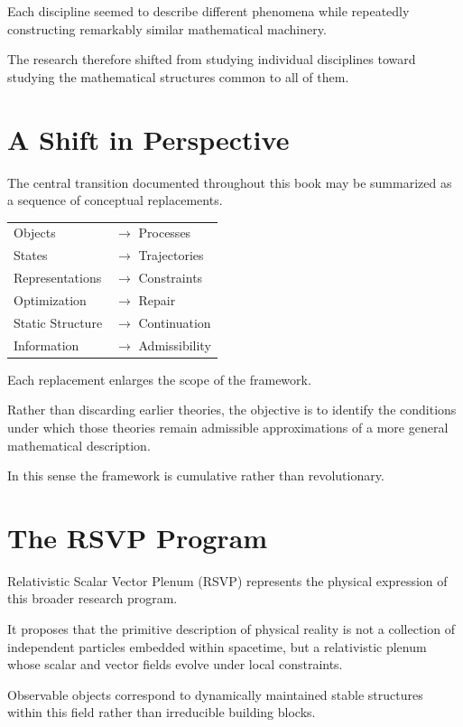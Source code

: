\documentclass[11pt,oneside]{book}
\numberwithin{equation}{chapter}
\theoremstyle{definition}
\theoremstyle{plain}
\begin{document}
Each discipline seemed to describe different phenomena while repeatedly
constructing remarkably similar mathematical machinery.

The research therefore shifted from studying individual disciplines toward
studying the mathematical structures common to all of them.

\section{A Shift in Perspective}

The central transition documented throughout this book may be summarized as
a sequence of conceptual replacements.

\begin{center}
\begin{tabular}{ll}
Objects & $\longrightarrow$ Processes \\
States & $\longrightarrow$ Trajectories \\
Representations & $\longrightarrow$ Constraints \\
Optimization & $\longrightarrow$ Repair \\
Static Structure & $\longrightarrow$ Continuation \\
Information & $\longrightarrow$ Admissibility
\end{tabular}
\end{center}

Each replacement enlarges the scope of the framework.

Rather than discarding earlier theories, the objective is to identify the
conditions under which those theories remain admissible approximations of a
more general mathematical description.

In this sense the framework is cumulative rather than revolutionary.

\section{The RSVP Program}

Relativistic Scalar Vector Plenum (RSVP) represents the physical expression
of this broader research program.

It proposes that the primitive description of physical reality is not a
collection of independent particles embedded within spacetime, but a
relativistic plenum whose scalar and vector fields evolve under local
constraints.

Observable objects correspond to dynamically maintained stable structures
within this field rather than irreducible building blocks.
\end{document}
